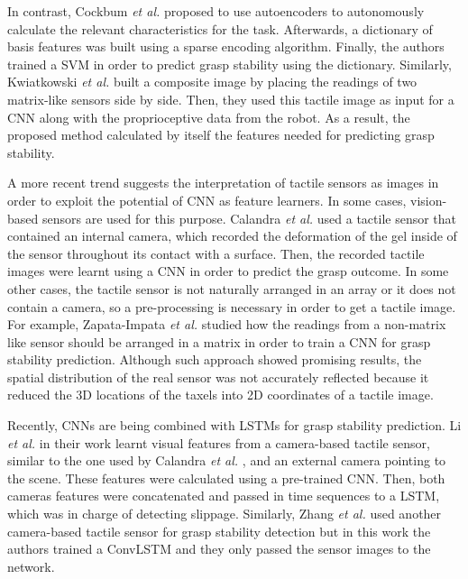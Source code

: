 In contrast, Cockbum \emph{et al.} \cite{Cockbum2017} proposed to use autoencoders to autonomously calculate the relevant characteristics for the task. Afterwards, a dictionary of basis features was built using a sparse encoding algorithm. Finally, the authors trained a \ac{SVM} in order to predict grasp stability using the dictionary. Similarly, Kwiatkowski \emph{et al.} \cite{Kwiatkowski2017} built a composite image by placing the readings of two matrix-like sensors side by side. Then, they used this tactile image as input for a \ac{CNN} along with the proprioceptive data from the robot. As a result, the proposed method calculated by itself the features needed for predicting grasp stability.

A more recent trend suggests the interpretation of tactile sensors as images in order to exploit the potential of \ac{CNN} as feature learners. In some cases, vision-based sensors are used for this purpose. Calandra \emph{et al.} \cite{Calandra2017} used a tactile sensor that contained an internal camera, which recorded the deformation of the gel inside of the sensor throughout its contact with a surface. Then, the recorded tactile images were learnt using a \ac{CNN} in order to predict the grasp outcome. In some other cases, the tactile sensor is not naturally arranged in an array or it does not contain a camera, so a pre-processing is necessary in order to get a tactile image. For example, Zapata-Impata \emph{et al.} \cite{Zapata2018} studied how the readings from a non-matrix like sensor should be arranged in a matrix in order to train a \ac{CNN} for grasp stability prediction. Although such approach showed promising results, the spatial distribution of the real sensor was not accurately reflected because it reduced the \acs{3D} locations of the taxels into \acs{2D} coordinates of a tactile image.

Recently, \acp{CNN} are being combined with \acp{LSTM} for grasp stability prediction. Li \emph{et al.} \cite{Li2018} in their work learnt visual features from a camera-based tactile sensor, similar to the one used by Calandra \emph{et al.} \cite{Calandra2017}, and an external camera pointing to the scene. These features were calculated using a pre-trained \ac{CNN}. Then, both cameras features were concatenated and passed in time sequences to a \ac{LSTM}, which was in charge of detecting slippage. Similarly, Zhang \emph{et al.} \cite{Zhang2018} used another camera-based tactile sensor for grasp stability detection but in this work the authors trained a \ac{ConvLSTM} and they only passed the sensor images to the network.

